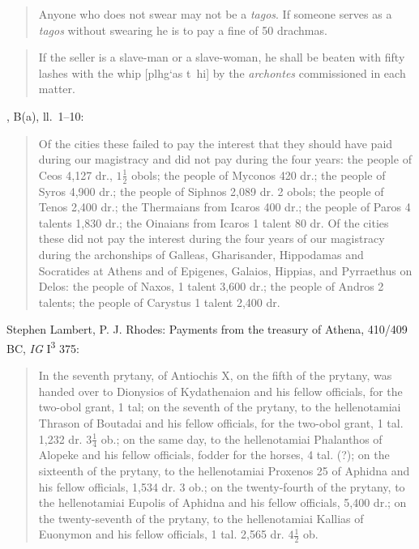 \documentclass{article}
\newcommand{\Gk}[1]{\selectlanguage{polutonikogreek}#1\selectlanguage{english}}
\begin{document}
\begin{quote}
Anyone who does not swear may not be a {\em tagos}. If someone serves as a {\em tagos} without swearing he is to pay a fine of 50 drachmas.
\end{quote}

\begin{quote}
If the seller is a slave-man or a slave-woman, he shall be beaten with fifty lashes with the whip [\Gk{plhg`as t~hi}] by the {\em archontes} commissioned in each matter.
\end{quote}

\cite[p.~141]{rhodes}, B(a), ll.~1--10:

\begin{quote}
Of the cities these failed to pay the interest that they should have paid during our magistracy and did not pay during the four years:
the people of Ceos 4,127 dr., $1 \frac{1}{2}$ obols; the people of Myconos
420 dr.; the people of Syros 4,900 dr.; the people of
Siphnos 2,089 dr. 2 obols; the people of Tenos 2,400 dr.; the Thermaians from Icaros 400 dr.;
the people of Paros 4 talents 1,830 dr.; the Oinaians from Icaros 1 talent 80 dr. Of the cities these did not pay the interest during the
four years of our magistracy during the archonships of Galleas, Gharisander, Hippodamas and Socratides at Athens and of Epigenes,
Galaios, Hippias, and Pyrraethus on Delos: the people of Naxos, 1 talent 3,600 dr.; the people of Andros 2 talents; the people of
Carystus 1 talent 2,400 dr.
\end{quote}

Stephen Lambert, P. J. Rhodes: Payments from the treasury of Athena, 410/409 BC, {\em IG} I\textsuperscript{3} 375:

\begin{quote}
In the seventh prytany, of Antiochis X, on the fifth of the prytany, was handed over to Dionysios of Kydathenaion and his fellow officials, for the two-obol grant, 1 tal; on the seventh
of the prytany, to the hellenotamiai Thrason of Boutadai and his fellow officials, for the two-obol grant, 1 tal. 1,232 dr. $3 \frac{1}{4}$ ob.; on the same day, to the hellenotamiai
Phalanthos of Alopeke and his fellow officials, fodder for the horses, 4 tal. (?); on the sixteenth of the prytany, to the hellenotamiai Proxenos 25 of Aphidna and his fellow officials,
1,534 dr. 3 ob.; on the twenty-fourth of the prytany, to the hellenotamiai Eupolis of Aphidna and his fellow officials, 5,400 dr.; on the twenty-seventh of the prytany, to the
hellenotamiai Kallias of Euonymon and his fellow officials, 1 tal. 2,565 dr. $4 \frac{1}{2}$ ob.
\end{quote}
\end{document}

